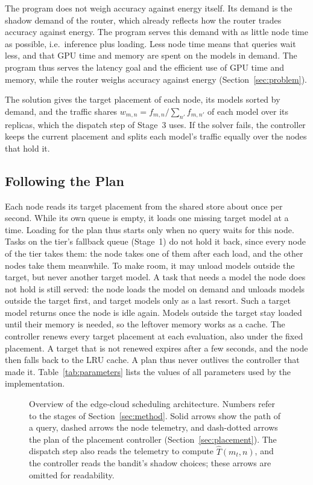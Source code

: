 The program does not weigh accuracy against energy itself.
Its demand is the shadow demand of the router, which already reflects how the router trades accuracy against energy.
The program serves this demand with as little node time as possible, i.e.\ inference plus loading.
Less node time means that queries wait less, and that GPU time and memory are spent on the models in demand.
The program thus serves the latency goal and the efficient use of GPU time and memory, while the router weighs accuracy against energy (Section~\ref{sec:problem}).

The solution gives the target placement of each node, its models sorted by demand, and the traffic shares $w_{m,n} = f_{m,n} / \sum_{n'} f_{m,n'}$ of each model over its replicas, which the dispatch step of Stage~3 uses.
If the solver fails, the controller keeps the current placement and splits each model's traffic equally over the nodes that hold it.

\subsection{Following the Plan}

Each node reads its target placement from the shared store about once per second.
While its own queue is empty, it loads one missing target model at a time.
Loading for the plan thus starts only when no query waits for this node.
Tasks on the tier's fallback queue (Stage~1) do not hold it back, since every node of the tier takes them: the node takes one of them after each load, and the other nodes take them meanwhile.
To make room, it may unload models outside the target, but never another target model.
A task that needs a model the node does not hold is still served: the node loads the model on demand and unloads models outside the target first, and target models only as a last resort.
Such a target model returns once the node is idle again.
Models outside the target stay loaded until their memory is needed, so the leftover memory works as a cache.
The controller renews every target placement at each evaluation, also under the fixed placement.
A target that is not renewed expires after a few seconds, and the node then falls back to the LRU cache.
A plan thus never outlives the controller that made it.
Table~\ref{tab:parameters} lists the values of all parameters used by the implementation.

\begin{figure}[htbp]
    \centering
    
    \caption[Overview of the edge-cloud scheduling architecture]{Overview of the edge-cloud scheduling architecture. Numbers refer to the stages of Section~\ref{sec:method}. Solid arrows show the path of a query, dashed arrows the node telemetry, and dash-dotted arrows the plan of the placement controller (Section~\ref{sec:placement}). The dispatch step also reads the telemetry to compute $\hat{T}(m_t, n)$, and the controller reads the bandit's shadow choices; these arrows are omitted for readability.}
    \label{fig:architecture}
\end{figure}

